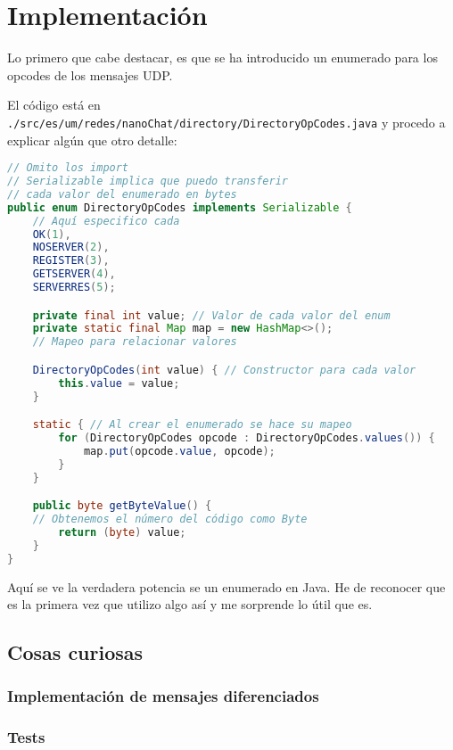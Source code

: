 \documentclass{article}
\begin{document}
\section{Implementación}

Lo primero que cabe destacar, es que se ha introducido un enumerado para los opcodes de los mensajes UDP.

El código está en \texttt{./src/es/um/redes/nanoChat/directory/DirectoryOpCodes.java} y procedo a explicar algún que otro detalle:

\begin{lstlisting}[language=Java, caption=Parte del código]
// Omito los import
// Serializable implica que puedo transferir
// cada valor del enumerado en bytes
public enum DirectoryOpCodes implements Serializable {
    // Aquí especifico cada 
    OK(1),
    NOSERVER(2),
    REGISTER(3),
    GETSERVER(4),
    SERVERRES(5);

    private final int value; // Valor de cada valor del enum
    private static final Map map = new HashMap<>(); 
    // Mapeo para relacionar valores

    DirectoryOpCodes(int value) { // Constructor para cada valor
        this.value = value;
    }

    static { // Al crear el enumerado se hace su mapeo
        for (DirectoryOpCodes opcode : DirectoryOpCodes.values()) {
            map.put(opcode.value, opcode);
        }
    }

    public byte getByteValue() {
    // Obtenemos el número del código como Byte
        return (byte) value;
    }
}
\end{lstlisting}

Aquí se ve la verdadera potencia se un enumerado en Java. He de reconocer que es la primera vez que utilizo algo así y me sorprende lo útil que es.

\subsection{Cosas curiosas}

\subsubsection{Implementación de mensajes diferenciados}

\subsubsection{Tests}
\end{document}
